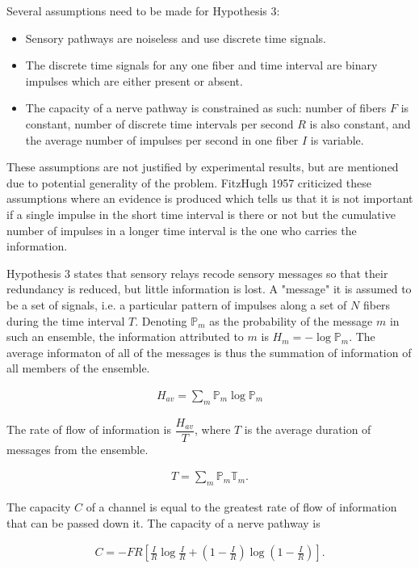 \documentclass[twoside]{article}
\begin{document}
\begin{multicols}{2}
Several assumptions need to be made for Hypothesis 3:
\begin{itemize}
	\item Sensory pathways are noiseless and use discrete time signals.
	\item The discrete time signals for any one fiber and time interval are binary impulses which are either present or absent.
	\item The capacity of a nerve pathway is constrained as such: number of fibers $F$ is constant, number of discrete time intervals per second $R$ is also constant, and the average number of impulses per second in one fiber $I$ is variable.
\end{itemize}

These assumptions are not justified by experimental results, but are mentioned due to potential generality of the problem. FitzHugh 1957 criticized these assumptions where an evidence is produced which tells us that it is not important if a single impulse in the short time interval is there or not but the cumulative number of impulses in a longer time interval is the one who carries the information. 

Hypothesis 3 states that sensory relays recode sensory messages so that their redundancy is reduced, but little information is lost. A "message" it is assumed to be a set of signals, i.e. a particular pattern of impulses along a set of $N$ fibers during the time interval $T$. Denoting $\mathbb{P}_m$ as the probability of the message $m$ in such an ensemble, the information attributed to $m$ is $H_{m}=-\log \mathbb{P}_m$. The average informaton of all of the messages is thus the summation of information of all members of the ensemble.

\begin{align} \label{eq:1}
	H_{av}= \sum_m \mathbb{P}_m \log \mathbb{P}_m
\end{align}

The rate of flow of information is $\dfrac{H_{av}}{T}$, where $T$ is the average duration of messages from the ensemble.

\begin{align} \label{eq:2}
	T = \sum_m \mathbb{P}_m \mathbb{T}_m.
\end{align}

The capacity $C$ of a channel is equal to the greatest rate of flow of information that can be passed down it. The capacity of a nerve pathway is

\begin{align} \label{eq:3}
	C = - FR \left[\frac{I}{R} \log \frac{I}{R} +\left(1-\frac{I}{R} \right) \log  \left(1-\frac{I}{R} \right) \right].
\end{align}


\end{multicols}
\end{document}
